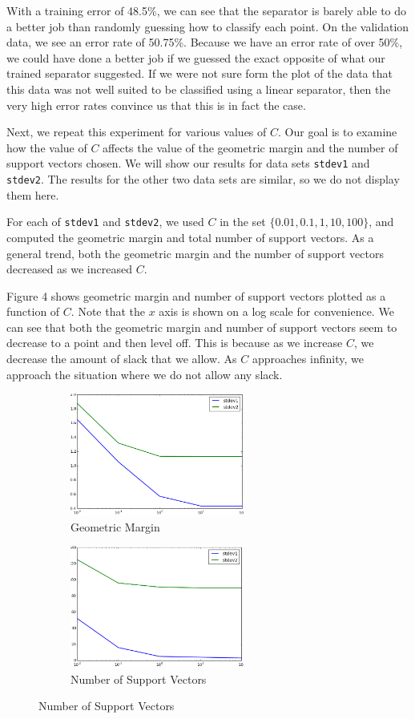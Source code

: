 \documentclass{sigchi}
\begin{document}
With a training error of 48.5\%, we can see that the separator is barely able to do a better job than randomly guessing how to classify each point. On the validation data, we see an error rate of 50.75\%. Because we have an error rate of over 50\%, we could have done a better job if we guessed the exact opposite of what our trained separator suggested. If we were not sure form the plot of the data that this data was not well suited to be classified using a linear separator, then the very high error rates convince us that this is in fact the case.

Next, we repeat this experiment for various values of $C$. Our goal is to examine how the value of $C$ affects the value of the geometric margin and the number of support vectors chosen. We will show our results for data sets \texttt{stdev1} and \texttt{stdev2}. The results for the other two data sets are similar, so we do not display them here.

For each of \texttt{stdev1} and \texttt{stdev2}, we used $C$ in the set $\{0.01, 0.1, 1, 10, 100\}$, and computed the geometric margin and total number of support vectors. As a general trend, both the geometric margin and the number of support vectors decreased as we increased $C$. %

Figure 4 shows geometric margin and number of support vectors plotted as a function of $C$. Note that the $x$ axis is shown on a log scale for convenience. We can see that both the geometric margin and number of support vectors seem to decrease to a point and then level off. This is because as we increase $C$, we decrease the amount of slack that we allow. As $C$ approaches infinity, we approach the situation where we do not allow any slack.

\begin{figure}
\centering

\begin{subfigure}[b]{2.25in}
	\includegraphics[width = 2.25in]{plots/1-3/margin.png}
	\caption{Geometric Margin}
\end{subfigure}

\begin{subfigure}[b]{2.25in}
	\includegraphics[width = 2.25in]{plots/1-3/support_vectors.png}
	\caption{Number of Support Vectors}
\end{subfigure}

\end{figure}
\end{document}
